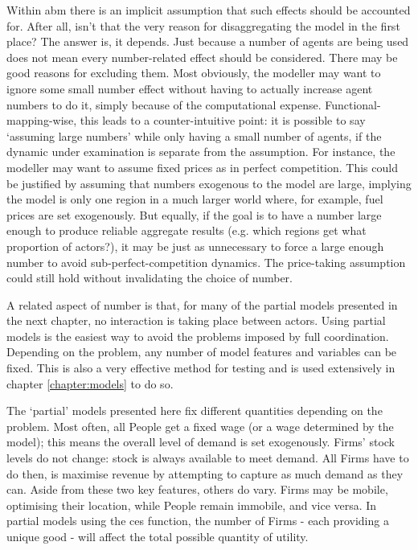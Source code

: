 {Within \gls{abm} there is an implicit assumption that such effects should be accounted for. After all, isn't that the very reason for disaggregating the model in the first place? The answer is, it depends. Just because a number of agents are being used does not mean every number-related effect should be considered. There may be good reasons for excluding them. Most obviously, the modeller may want to ignore some small number effect without having to actually increase agent numbers to do it, simply because of the computational expense. Functional-mapping-wise, this leads to a counter-intuitive point: it is possible to say `assuming large numbers' while only having a small number of agents, if the dynamic under examination is separate from the assumption. For instance, the modeller may want to assume fixed prices as in perfect competition. This could be justified by assuming that numbers exogenous to the model are large, implying the model is only one region in a much larger world where, for example, fuel prices are set exogenously. But equally, if the goal is to have a number large enough to produce reliable aggregate results (e.g. which regions get what proportion of actors?), it may be just as unnecessary to force a large enough number to avoid sub-perfect-competition dynamics. The price-taking assumption could still hold without invalidating the choice of number.

A related aspect of number is that, for many of the partial models presented in the next chapter, no interaction is taking place between actors. Using partial models is the easiest way to avoid the problems imposed by full coordination. Depending on the problem, any number of model features and variables can be fixed. This is also a very effective method for testing and is used extensively in chapter \ref{chapter:models} to do so. 

The `partial' models presented here fix different quantities depending on the problem. Most often, all People get a fixed wage (or a wage determined by the model); this means the overall level of demand is set exogenously. Firms' stock levels do not change: stock is always available to meet demand. All Firms have to do then, is maximise revenue by attempting to capture as much demand as they can. Aside from these two key features, others do vary. Firms may be mobile, optimising their location, while People remain immobile, and vice versa. In partial models using the \gls{ces} function, the number of Firms - each providing a unique good - will affect the total possible quantity of utility. 

}
